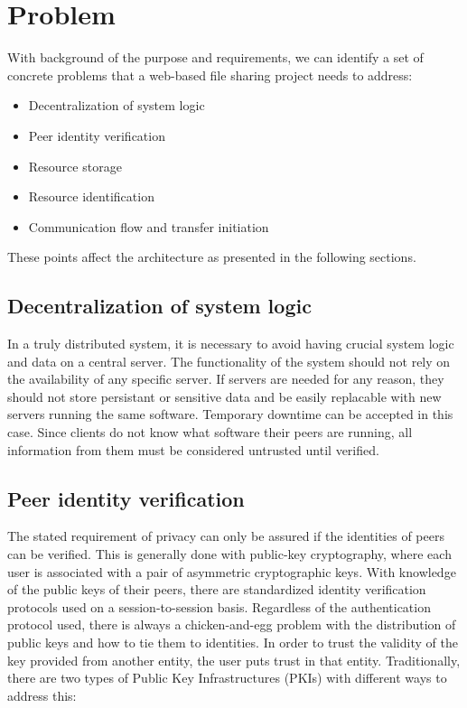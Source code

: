 \section{Problem}
\label{sec:problem}

With background of the purpose and requirements, we can identify a set of concrete problems that a web-based file sharing project needs to address:

\begin{itemize}
\item Decentralization of system logic
\item Peer identity verification
\item Resource storage
\item Resource identification
\item Communication flow and transfer initiation
\end{itemize}

These points affect the architecture as presented in the following sections.

\subsection{Decentralization of system logic}
In a truly distributed system, it is necessary to avoid having crucial system logic and data on a central server. The functionality of the system should not rely on the availability of any specific server. If servers are needed for any reason, they should not store persistant or sensitive data and be easily replacable with new servers running the same software. Temporary downtime can be accepted in this case. Since clients do not know what software their peers are running, all information from them must be considered untrusted until verified.

\subsection{Peer identity verification}
The stated requirement of privacy can only be assured if the identities of peers can be verified. This is generally done with public-key cryptography, where each user is associated with a pair of asymmetric cryptographic keys. With knowledge of the public keys of their peers, there are standardized identity verification protocols used on a session-to-session basis. Regardless of the authentication protocol used, there is always a chicken-and-egg problem with the distribution of public keys and how to tie them to identities. In order to trust the validity of the key provided from another entity, the user puts trust in that entity. Traditionally, there are two types of Public Key Infrastructures (PKIs) with different ways to address this:

